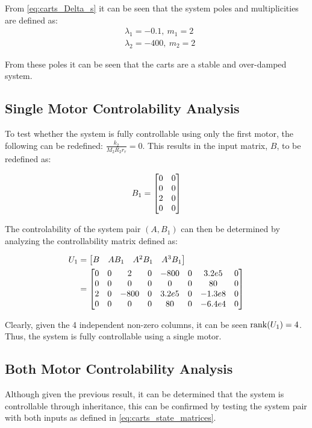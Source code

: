 \documentclass[]{article}
\begin{document}
			From \eqref{eq:carts_Delta_s} it can be seen that the system poles and multiplicities are defined as:
			\begin{equation}
				\begin{aligned}
					&\lambda_1 = -0.1, \ m_1 = 2\\
					&\lambda_2 = -400, \ m_2 = 2
				\end{aligned}
			\end{equation}
		
			From these poles it can be seen that the carts are a stable and over-damped system.
	
	\newpage
	\subsection{Single Motor Controlability Analysis}
		To test whether the system is fully controllable using only the first motor, the following can be redefined: $\frac{k_2}{M_2 R_2 r_r} = 0$. This results in the input matrix, $B$, to be redefined as:
		
		\begin{equation}
			B_1 = \mqty[0	&0\\
						0	&0\\
						2	&0\\
						0	&0]
		\end{equation}
		
		The controlability of the system pair $(A, B_1)$ can then be determined by analyzing the controllability matrix defined as:
		
		\begin{equation}
			\begin{aligned}
				U_1 &= \mqty[B		&A B_1		&A^2 B_1	&A^3 B_1]\\
					&= \mqty[0	&0	&2		&0	&-800	&0	&3.2e5	&0\\
							 0	&0	&0		&0	&0		&0	&80		&0\\
							 2	&0	&-800	&0	&3.2e5	&0	&-1.3e8	&0\\
							 0	&0	&0		&0	&80		&0	&-6.4e4	&0]
			\end{aligned}
		\end{equation}
		
		Clearly, given the 4 independent non-zero columns, it can be seen $\rank(U_1) = 4$. Thus, the system is fully controllable using a single motor.
		
	\subsection{Both Motor Controlability Analysis}
		Although given the previous result, it can be determined that the system is controllable through inheritance, this can be confirmed by testing the system pair with both inputs as defined in \eqref{eq:carts_state_matrices}.
		
\end{document}
